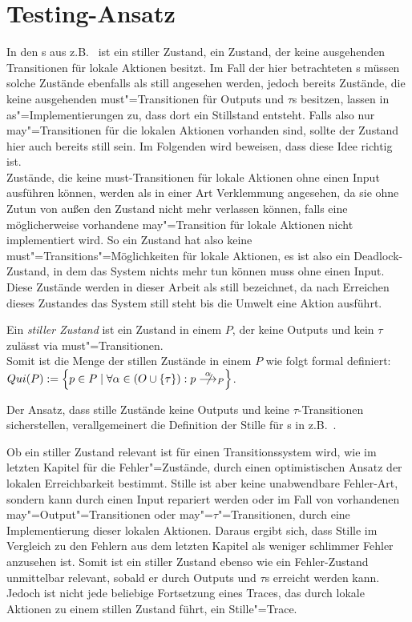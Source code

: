\section{Testing-Ansatz}

In den \EIO{}s aus z.B.~\cite{Schinko2016BA} ist ein stiller Zustand, ein
Zustand, der keine ausgehenden Transitionen für lokale Aktionen besitzt. Im
Fall der hier betrachteten \MEIO{}s müssen solche Zustände ebenfalls als still
angesehen werden, jedoch bereits Zustände, die keine ausgehenden
must"=Transitionen für Outputs und $\tau$s besitzen, lassen in
as"=Implementierungen zu, dass dort ein Stillstand entsteht. Falls also nur
may"=Transitionen für die lokalen Aktionen vorhanden sind, sollte der Zustand
hier auch bereits still sein. Im Folgenden wird beweisen, dass diese Idee
richtig ist.\\
Zustände, die keine must-Transitionen für lokale Aktionen ohne einen Input
ausführen können, werden als in einer Art Verklemmung angesehen, da sie ohne
Zutun von außen den Zustand nicht mehr verlassen können, falls eine
möglicherweise vorhandene may"=Transition für lokale Aktionen nicht
implementiert wird. So ein Zustand hat also keine
must"=Transitions"=Möglichkeiten für lokale Aktionen, es ist also ein
Deadlock-Zustand, in dem das System nichts mehr tun können muss ohne einen
Input. Diese Zustände werden in dieser Arbeit als still bezeichnet, da nach
Erreichen dieses Zustandes das System still steht bis die Umwelt eine
Aktion ausführt.

\begin{Def}[Stillstand]
  Ein \emph{stiller Zustand} ist ein Zustand in einem \MEIO{} $P$, der keine
  Outputs und kein $\tau$ zulässt via must"=Transitionen.\\
  Somit ist die Menge der stillen Zustände in einem \MEIO{} $P$ wie folgt
  formal definiert: $Qui(P):=\left\{p\in P\mid \forall\alpha\in
  (O\cup\{\tau\}):p \nmust[\alpha]_P\right\}$.
\end{Def}

Der Ansatz, dass stille Zustände keine Outputs und keine $\tau$-Transitionen
sicherstellen, verallgemeinert die Definition der Stille für \EIO{}s in
z.B.~\cite{Schinko2016BA}.

Ob ein stiller Zustand relevant ist für einen Transitionssystem wird, wie im
letzten Kapitel für die Fehler"=Zustände, durch einen optimistischen Ansatz der
lokalen Erreichbarkeit bestimmt. Stille ist aber keine unabwendbare \glqq
Fehler-Art\grqq{}, sondern kann durch einen Input repariert werden oder im Fall
von vorhandenen may"=Output"=Transitionen oder may"=$\tau$"=Transitionen, durch
eine Implementierung dieser lokalen Aktionen. Daraus ergibt sich, dass Stille
im Vergleich zu den Fehlern aus dem letzten Kapitel als weniger \glqq schlimmer
Fehler\grqq{} anzusehen ist. Somit ist ein stiller Zustand ebenso wie ein
Fehler-Zustand unmittelbar relevant, sobald er durch Outputs und $\tau$s
erreicht werden kann. Jedoch ist nicht jede beliebige Fortsetzung eines Traces,
das durch lokale Aktionen zu einem stillen Zustand führt, ein Stille"=Trace.

